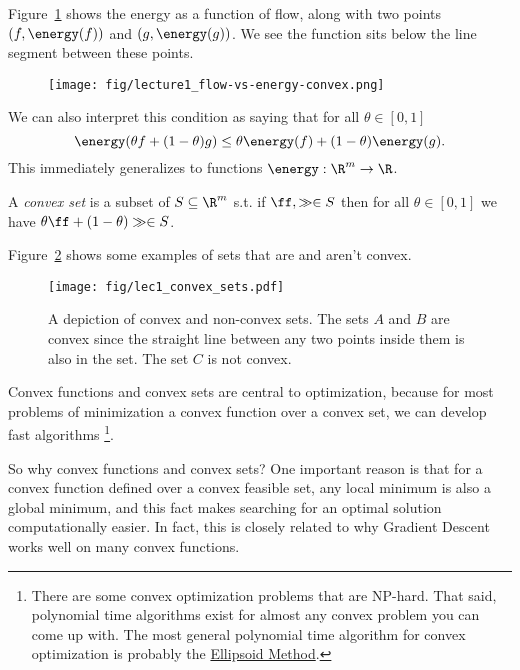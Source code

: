 Figure~\ref{fig:flow-vs-energy-convex} shows the energy as a function of flow, along with two
points $(f, \energy(f))$ and $(g,\energy(g))$. We see the function sits below the
line segment between these points.

\begin{figure}[H]
  \centering
  \texttt{[image: fig/lecture1\_flow-vs-energy-convex.png]}
  \label{fig:flow-vs-energy-convex}
\end{figure}
We can also interpret this condition as saying that for all $\theta \in [0,1]$
\[
  \energy(\theta f + (1-\theta)g) \leq \theta \energy(f) +
  (1-\theta) \energy(g)
  .
  \]
This immediately generalizes to functions $\energy:\R^m \to \R$.

A \emph{convex set} is a subset of $S \subseteq \R^m$ s.t.
if $\ff, \gg \in S$ then for all $\theta \in [0,1]$ we have
$\theta \ff + (1-\theta) \gg \in S$.

Figure~\ref{fig:convex_sets} shows some examples of sets that are and
aren't convex.

\begin{figure}[t]
\begin{centering}
                \texttt{[image: fig/lec1\_convex\_sets.pdf]}
                 \caption{A depiction of convex and non-convex sets.  The sets $A$ and $B$ are convex since the straight line between any two points inside them is also in the set.  The set $C$ is not convex.}\label{fig:convex_sets}
                 \end{centering}
\end{figure}


Convex functions and convex sets are central to optimization,
because for most problems of minimization a convex function over a
convex set, we can develop fast algorithms \footnote{
 There are some convex optimization problems that are NP-hard.
  That said, polynomial time algorithms exist for almost any convex
  problem you can come up with.
  The most general polynomial time algorithm for convex optimization
  is probably the
  \href{https://en.wikipedia.org/wiki/Ellipsoid_method}{Ellipsoid Method}.
}.


So why convex functions and convex sets?
One important reason is that
for a convex function defined over a convex feasible set,
any local minimum is also a global minimum,
and this fact makes searching for an optimal solution
computationally easier.
In fact, this is closely related to why Gradient Descent works well
on many convex functions.


